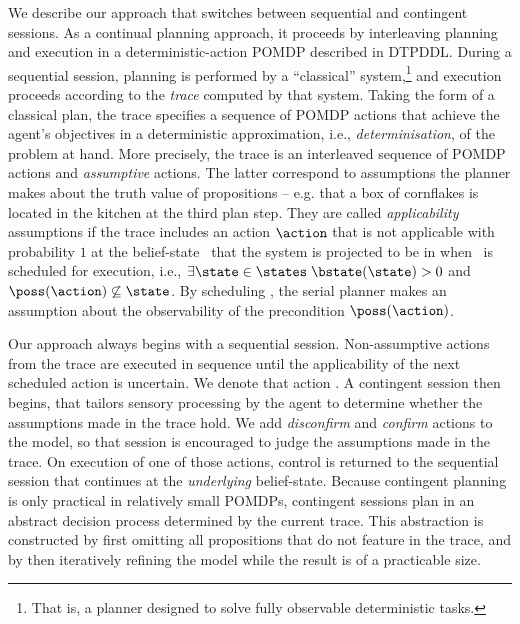

We describe our approach that switches between sequential and
contingent sessions. As a continual planning approach, it proceeds by
interleaving planning and execution in a deterministic-action POMDP
described in DTPDDL. During a sequential session, planning is
performed by a ``classical'' system,\footnote{That is, a planner
designed to solve fully observable deterministic tasks.}  and
execution proceeds according to the {\em trace} computed by that
system. Taking the form of a classical plan, the trace specifies a
sequence of POMDP actions that achieve the agent's objectives in a
deterministic approximation, i.e., {\em determinisation}, of the
problem at hand. More precisely, the trace is an interleaved sequence
of POMDP actions and {\em assumptive} actions. The latter correspond
to assumptions the planner makes about the truth value of propositions
-- e.g. that a box of cornflakes is located in the kitchen at the
third plan step. They are called {\em applicability} assumptions if
the trace includes an action $\action$ that is not applicable with
probability $1$ at the belief-state
\bstate\ that the system is projected to be in when \action\ is
scheduled for execution, i.e., $\exists\state\in\states\;
\bstate(\state) > 0$ and $\poss(\action)\not\subseteq\state$. By
scheduling
\action,  the serial planner makes an assumption about the
observability of the precondition $\poss(\action)$.

Our approach always begins with a sequential session. Non-assumptive
actions from the trace are executed in sequence until the
applicability of the next scheduled action is uncertain. We denote
that action \switchAction.  A contingent session then begins, that
tailors sensory processing by the agent to determine whether the
assumptions made in the trace hold. 
We add {\em disconfirm} and {\em confirm} actions to the model, so
that session is encouraged to judge the assumptions made in the
trace. On execution of one of those actions, control is returned to
the sequential session that continues at the {\em underlying}
belief-state.
Because contingent planning is only practical in relatively small
POMDPs, contingent sessions plan in an abstract decision process
determined by the current trace. This abstraction is constructed by
first omitting all propositions that do not feature in the trace, and
by then iteratively refining the model while the result is of a
practicable size.

